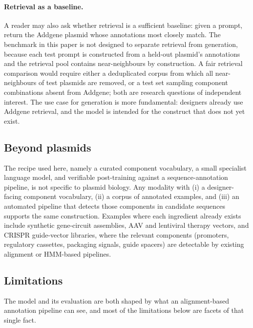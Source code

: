 \documentclass{article}
\begin{document}
\paragraph{Retrieval as a baseline.}
A reader may also ask whether retrieval is a sufficient baseline: given a prompt, return
the Addgene plasmid whose annotations most closely match. The benchmark in this paper is
not designed to separate retrieval from generation, because each test prompt is
constructed from a held-out plasmid's annotations and the retrieval pool contains
near-neighbours by construction. A fair retrieval comparison would require either a
deduplicated corpus from which all near-neighbours of test plasmids are removed, or a
test set sampling component combinations absent from Addgene; both are research
questions of independent interest. The use case for generation is more fundamental:
designers already use Addgene retrieval, and the model is intended for the construct
that does not yet exist.

\subsection{Beyond plasmids}

The recipe used here, namely a curated component vocabulary, a small specialist
language model, and verifiable post-training against a sequence-annotation pipeline, is
not specific to plasmid biology. Any modality with (i) a designer-facing component
vocabulary, (ii) a corpus of annotated examples, and (iii) an automated pipeline that
detects those components in candidate sequences supports the same construction. Examples
where each ingredient already exists include synthetic gene-circuit assemblies, AAV and
lentiviral therapy vectors, and CRISPR guide-vector libraries, where the relevant
components (promoters, regulatory cassettes, packaging signals, guide spacers) are
detectable by existing alignment or HMM-based pipelines.

\subsection{Limitations}

The model and its evaluation are both shaped by what an alignment-based annotation
pipeline can see, and most of the limitations below are facets of that single fact.
\end{document}

